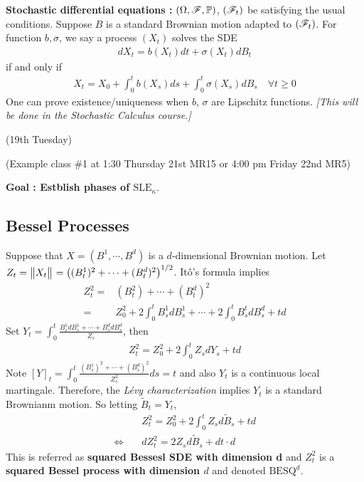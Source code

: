 \documentclass[12pt,a4paper]{article}
\begin{document}
\textbf{Stochastic differential equations :} $(\Omega, \mathscr{F}, \mathbb{P})$, $(\mathscr{F}_t)$ be satisfying the usual conditions. Suppose $B$ is a standard Brownian motion adapted to $(\mathscr{F}_t)$. For function $b, \sigma$, we say a process $(X_t)$ solves the SDE
\begin{align*}
dX_t = b(X_t) dt + \sigma(X_t) dB_t
\end{align*}
if and only if
\begin{align*}
X_t =X_0 + \int_0^t b(X_s)ds + \int_0^t \sigma(X_s) dB_s \quad \forall t\geq 0
\end{align*}
One can prove existence/uniqueness when $b$, $\sigma$ are Lipschitz functions. \emph{[This will be done in the Stochastic Calculus course.]}
\s

\newday

(19th Tuesday)
\s

(Example class \#1 at 1:30 Thursday 21st MR15 or 4:00 pm Friday 22nd MR5)
\s

\textbf{Goal : Estblish phases of $\text{SLE}_{\kappa}$}.

\subsection*{Bessel Processes}

Suppose that $X = (B^1, \cdots, B^d)$ is a $d$-dimensional Brownian motion. Let $Z_t = \bigl\lVert X_t\bigr\rVert_{} = \big( (B_t^1)^2 + \cdots + (B_t^d)^2 \big)^{1/2}$. It\^o's formula implies
\begin{align*}
Z_t^2 =& (B_t^2) + \cdots + (B_t^d)^2 \\
=& Z_0^2 + 2\int_0^t B_s^1 dB_s^1 + \cdots + 2\int_0^t B_s^t dB_s^d + td
\end{align*}
Set $Y_t = \int_0^t \frac{B_s^1 dB_s^1 + \cdots + B_s^d dB_s^d}{Z_s}$, then
\begin{align*}
Z_t^2 = Z_0^2 + 2\int_0^t Z_s dY_s + td
\end{align*}
Note $[Y]_t =\int_0^t \frac{(B_s^1)^2 + \cdots + (B_s^d)^2}{Z_s^2}ds =t$ and also $Y_t$ is a continuous local martingale. Therefore, the \emph{L\'evy characterization} implies $Y_t$ is a standard Brownianm motion. So letting $\tilde{B}_t = Y_t$,
\begin{align*}
& Z_t^2 = Z_0^2 + 2\int_0^t Z_s d \tilde{B}_s + td \\ 
\Leftrightarrow \quad & dZ_t^2 = 2Z_s d\tilde{B}_s + dt \cdot d  
\end{align*}
This is referred as \textbf{squared Bessesl SDE with dimension d} and $Z_t^2$ is a \textbf{squared Bessel process with dimension $d$} and denoted $\text{BESQ}^d$.
\s
\end{document}
